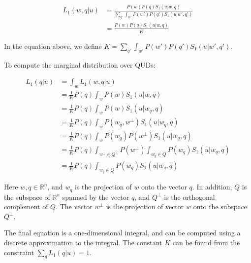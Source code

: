 \documentclass[12pt]{article}
\begin{document}
\begin{align}
L_1(w,q | u) &= \frac{P(w)P(q)S_1(u|w,q)}{\sum_{q'} \int_{w'} P(w')P(q')S_1(u|w',q')} \\
&= \frac{P(w)P(q)S_1(u|w,q)}{K} 
\end{align}

In the equation above, we define $K = \sum_{q'} \int_{w'} P(w')P(q')S_1(u|w',q')$.



To compute the marginal distribution over QUDs:

\begin{align}
L_1(q | u) &= \int_{w}L_1(w,q | u) \\
&= \frac{1}{K}P(q) \int_{w}P(w)S_1(u|w,q) \\
&= \frac{1}{K}P(q) \int_{w}P(w)S_1(u|w_q,q) \\
&= \frac{1}{K}P(q) \int_{w}P(w_q, w^\bot)S_1(u|w_q,q) \\
&= \frac{1}{K}P(q) \int_{w}P(w_q) P(w^\bot)S_1(u|w_q,q) \\
&= \frac{1}{K}P(q) \int_{w^\bot \in Q^\bot}P(w^\bot)  \int_{w_q \in Q}P(w_q) S_1(u|w_q,q) \\
&= \frac{1}{K}P(q)  \int_{w_q \in Q}P(w_q) S_1(u|w_q,q)
\end{align}

Here $w, q\in \mathbb{R}^n$, and $w_q$ is the projection of $w$ onto the vector $q$. In addition, $Q$ is the subspace of $\mathbb{R}^n$ spanned by the vector $q$, and $Q^\bot$ is the orthogonal complement of $Q$. The vector $w^\bot$ is the projection of vector $w$ onto the subspace $Q^\bot$.



The final equation is a one-dimensional integral, and can be computed using a discrete approximation to the integral. The constant $K$ can be found from the constraint $\sum_q L_1(q|u) = 1$. 

 

 
\end{document}
